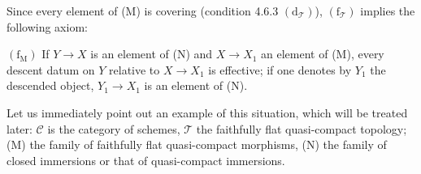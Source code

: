 Since every element of (M) is covering (condition
4.6.3 \((\mathrm d_{\mathcal T})\)),
\((\mathrm f_{\mathcal T})\) implies the following axiom:

\((\mathrm f_{\mathrm M})\) If \(Y\to X\) is an element
of (N) and \(X\to X_1\) an element of (M), every descent
datum on \(Y\) relative to \(X\to X_1\) is effective;
if one denotes by \(Y_1\) the descended object, \(Y_1\to X_1\)
is an element of (N).

Let us immediately point out an example of this situation,
which will be treated later: \(\mathcal C\) is the category
of schemes, \(\mathcal T\) the faithfully flat quasi-compact
topology; (M) the family of faithfully flat quasi-compact
morphisms, (N) the family of closed immersions or that
of quasi-compact immersions.


